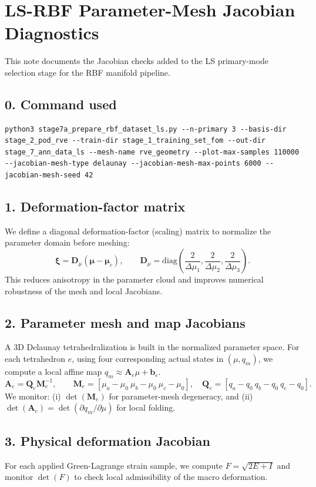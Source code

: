 \documentclass[11pt]{article}
\begin{document}
\section*{LS-RBF Parameter-Mesh Jacobian Diagnostics}
This note documents the Jacobian checks added to the LS primary-mode selection stage for the RBF manifold pipeline.
\subsection*{0. Command used}
\begin{verbatim}
python3 stage7a_prepare_rbf_dataset_ls.py --n-primary 3 --basis-dir stage_2_pod_rve --train-dir stage_1_training_set_fom --out-dir stage_7_ann_data_ls --mesh-name rve_geometry --plot-max-samples 110000 --jacobian-mesh-type delaunay --jacobian-mesh-max-points 6000 --jacobian-mesh-seed 42
\end{verbatim}
\subsection*{1. Deformation-factor matrix}
We define a diagonal deformation-factor (scaling) matrix to normalize the parameter domain before meshing:
\begin{equation}
\boldsymbol{\xi} = \mathbf{D}_{\mu}(\boldsymbol{\mu}-\boldsymbol{\mu}_c),\qquad \mathbf{D}_{\mu} = \mathrm{diag}\!\left(\frac{2}{\Delta \mu_1},\frac{2}{\Delta \mu_2},\frac{2}{\Delta \mu_3}\right).
\end{equation}
This reduces anisotropy in the parameter cloud and improves numerical robustness of the mesh and local Jacobians.
\subsection*{2. Parameter mesh and map Jacobians}
A 3D Delaunay tetrahedralization is built in the normalized parameter space. For each tetrahedron $e$, using four corresponding actual states in $(\mu,q_m)$, we compute a local affine map $q_m\approx \mathbf{A}_e\mu+\mathbf{b}_e$.
\begin{equation}
\mathbf{A}_e = \mathbf{Q}_e\mathbf{M}_e^{-1},\qquad \mathbf{M}_e=[\mu_a-\mu_0\ \mu_b-\mu_0\ \mu_c-\mu_0],\quad \mathbf{Q}_e=[q_a-q_0\ q_b-q_0\ q_c-q_0].
\end{equation}
We monitor: (i) $\det(\mathbf{M}_e)$ for parameter-mesh degeneracy, and (ii) $\det(\mathbf{A}_e)=\det(\partial q_m/\partial\mu)$ for local folding.
\subsection*{3. Physical deformation Jacobian}
For each applied Green-Lagrange strain sample, we compute $F=\sqrt{2E+I}$ and monitor $\det(F)$ to check local admissibility of the macro deformation.
\end{document}
